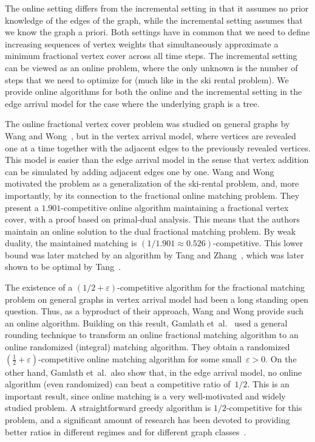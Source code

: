 \documentclass[a4paper,USenglish,cleveref,autoref,thm-restate,pdfa]{lipics-v2021}
\renewcommand{\epsilon}{\varepsilon}
\begin{document}
The online setting differs from the incremental setting in that it assumes no prior knowledge of the edges of the graph, while the incremental setting assumes that we know the graph a priori.
Both settings have in common that we need to define increasing sequences of vertex weights that simultaneously approximate a minimum fractional vertex cover across all time steps.
The incremental setting can be viewed as an online problem, where the only unknown is the number of steps that we need to optimize for (much like in the ski rental problem).
We provide online algorithms for both the online and the incremental setting in the edge arrival model for the case where the underlying graph is a tree.

The online fractional vertex cover problem was studied on general graphs by Wang and Wong~\cite{WangW2015}, but in the vertex arrival model, where vertices are revealed one at a time together with the adjacent edges to the previously revealed vertices.
This model is easier than the edge arrival model in the sense that vertex addition can be simulated by adding adjacent edges one by one.
Wang and Wong motivated the problem as a generalization of the ski-rental problem, and, more importantly, by its connection to the fractional online matching problem.
They present a $1.901$-competitive online algorithm maintaining a fractional vertex cover, with a proof based on primal-dual analysis. 
This means that the authors maintain an online solution to the dual fractional matching problem.
By weak duality, the maintained matching is $(1/1.901 \approx 0.526)$-competitive.
This lower bound was later matched by an algorithm by Tang and Zhang~\cite{TangZhang24},
which was later shown to be optimal by Tang~\cite{Tang2026}.

The existence of a $(1/2+\epsilon)$-competitive algorithm for the fractional matching problem on general graphs in vertex arrival model had been a long standing open question.
Thus, as a byproduct of their approach, Wang and Wong provide such an online algorithm. 
Building on this result, Gamlath et~al.~\cite{Gamlath} used a general rounding technique to transform an online fractional matching algorithm to an online randomized (integral) matching algorithm. 
They obtain a randomized $(\frac{1}{2}+\epsilon)$-competitive online matching algorithm for some small~$\epsilon > 0$. 
On the other hand, Gamlath et~al.~also show that, in the edge arrival model, no online algorithm (even randomized) can beat a competitive ratio of~$1/2$. 
This is an important result, since online matching is a very well-motivated and widely studied problem. 
A straightforward greedy algorithm is $1/2$-competitive for this problem, and a significant amount of research has been devoted to providing better ratios in different regimes and for different graph classes~\cite{KarpVV90,MahdianYan11,NaorWajc18,CohenWajc18,BuchbinderJainNaor07,LeeSingla20,BuchbinderSegevTkach19}.   
\end{document}

